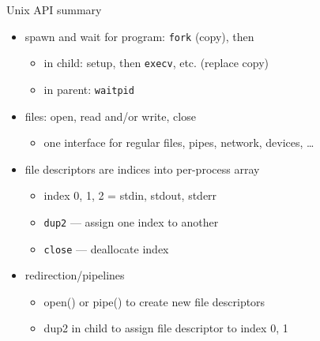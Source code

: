 \begin{frame}{Unix API summary}
    \begin{itemize}
    \item spawn and wait for program: \texttt{fork} (copy), then
        \begin{itemize}
        \item in child: setup, then \texttt{execv}, etc. (replace copy)
        \item in parent: \texttt{waitpid}
        \end{itemize}
    \item files: open, read and/or write, close
        \begin{itemize}
        \item one interface for regular files, pipes, network, devices, \ldots
        \end{itemize}
    \item file descriptors are indices into per-process array
        \begin{itemize}
        \item index 0, 1, 2 = stdin, stdout, stderr
        \item \texttt{dup2} --- assign one index to another
        \item \texttt{close} --- deallocate index
        \end{itemize}
    \item redirection/pipelines
        \begin{itemize}
        \item open() or pipe() to create new file descriptors
        \item dup2 in child to assign file descriptor to index 0, 1
        \end{itemize}
    \end{itemize}
\end{frame}
